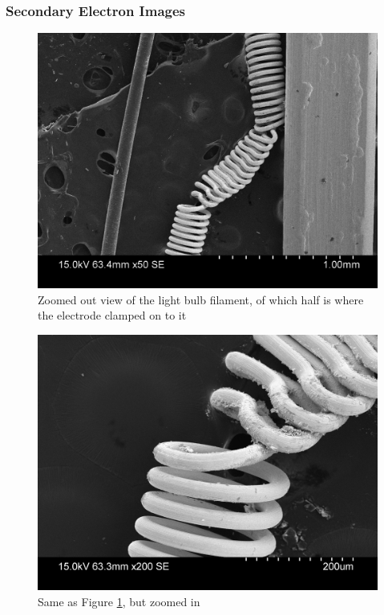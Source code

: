 \documentclass[a4paper]{scrartcl}
\begin{document}
\subsubsection{Secondary Electron Images}
\begin{figure}
    \centering
    \includegraphics[width = 15cm]{measurements/SE-filament-low.png}
    \caption{Zoomed out view of the light bulb filament, of which half is where the electrode clamped on to it}
    \label{fig:se-filament-low}
\end{figure}
\begin{figure}
    \centering
    \includegraphics[width = 15cm]{measurements/SE-filament-medium.png}
    \caption{Same as Figure \ref{fig:se-filament-low}, but zoomed in}
    \label{fig:se-filament-medium}
\end{figure}
\end{document}
